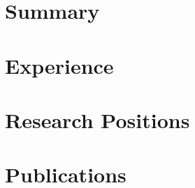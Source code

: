 \documentclass[11pt,a4paper,sans]{moderncv} %
\begin{document}
\makecvtitle %


%
\section{Summary}


%

\section{Experience}





%
{
\section{Research Positions}

}{}

%



%
\section{Publications}

{

}{}

{

}{}


%
%
\end{document}
